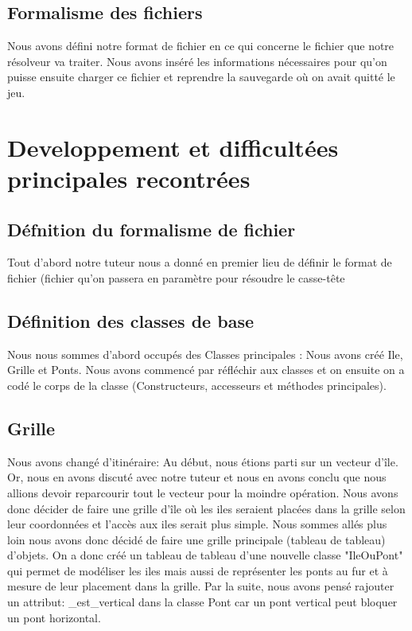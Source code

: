 \documentclass{article}
\begin{document}
    \subsection{\Large Formalisme des fichiers}
    \hspace{0.5cm} Nous avons défini notre format de fichier en ce qui concerne le fichier que notre résolveur va traiter. Nous avons inséré les informations nécessaires pour qu'on puisse ensuite charger ce fichier et reprendre la sauvegarde où on avait quitté le jeu. \newline
    
\section{\LARGE Developpement et difficultées principales recontrées}

    \subsection{\Large Défnition du formalisme de fichier}
    \hspace{0.5cm} Tout d'abord notre tuteur nous a donné en premier lieu de définir le format de fichier (fichier qu'on passera en paramètre pour résoudre le casse-tête
    \subsection{\Large Définition des classes de base}
    \hspace{0.5cm} Nous nous sommes d'abord occupés des Classes principales : Nous avons créé Ile, Grille et Ponts. Nous avons commencé par réfléchir aux classes et on ensuite on a codé le corps de la classe (Constructeurs, accesseurs et méthodes principales).
    \subsection{\Large Grille}
    \hspace{0.5cm} Nous avons changé d'itinéraire: Au début, nous étions parti sur un vecteur d'île. Or, nous en avons discuté avec notre tuteur et nous en avons conclu que nous allions devoir reparcourir tout le vecteur pour la moindre opération. Nous avons donc décider de faire une grille d'île où les iles seraient placées dans la grille selon leur coordonnées et l'accès aux iles serait plus simple. Nous sommes allés plus loin nous avons donc décidé de faire une grille principale (tableau de tableau) d'objets. On a donc créé un tableau de tableau d'une nouvelle classe "IleOuPont" qui permet de modéliser les iles mais aussi de représenter les ponts au fur et à mesure de leur placement dans la grille.
    Par la suite, nous avons pensé rajouter un attribut: \_est\_vertical dans la classe Pont car un pont vertical peut bloquer un pont horizontal.
    
\end{document}
